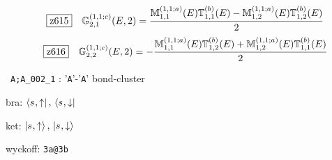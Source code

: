 \documentclass[fleqn,10pt,landscape]{jsarticle}
\begin{document}
\begin{dmath*}
\hspace*{3mm}\fbox{z615}\quad \mathbb{G}_{2,1}^{(1,1;c)}(E,2)=\frac{\mathbb{M}_{1,1}^{(1,1;a)}(E) \mathbb{T}_{1,1}^{(b)}(E) - \mathbb{M}_{1,2}^{(1,1;a)}(E) \mathbb{T}_{1,2}^{(b)}(E)}{2}
\end{dmath*}
\begin{dmath*}
\hspace*{3mm}\fbox{z616}\quad \mathbb{G}_{2,2}^{(1,1;c)}(E,2)=- \frac{\mathbb{M}_{1,1}^{(1,1;a)}(E) \mathbb{T}_{1,2}^{(b)}(E) + \mathbb{M}_{1,2}^{(1,1;a)}(E) \mathbb{T}_{1,1}^{(b)}(E)}{2}
\end{dmath*}
\vspace{5mm}

\noindent\textbullet\, \texttt{A;A_002_1} : '\texttt{A}'-'\texttt{A}' bond-cluster

\noindent\quad * bra: $\bra{s_{},\uparrow},\, \bra{s_{},\downarrow}$

\noindent\quad * ket: $\ket{s_{},\uparrow},\, \ket{s_{},\downarrow}$

\noindent\quad * wyckoff: \texttt{3a@3b}
\end{document}
